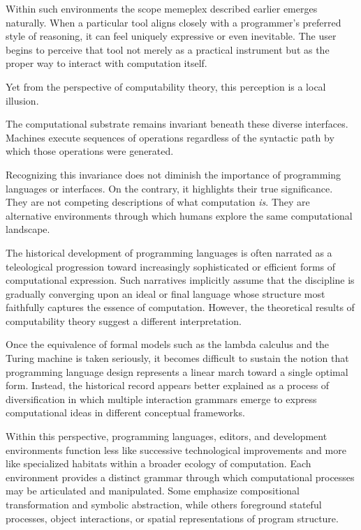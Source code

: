 \documentclass[11pt]{article}
\theoremstyle{definition}
\begin{document}
Within such environments the scope memeplex described earlier emerges
naturally. When a particular tool aligns closely with a programmer's
preferred style of reasoning, it can feel uniquely expressive or even
inevitable. The user begins to perceive that tool not merely as a
practical instrument but as the proper way to interact with
computation itself.

Yet from the perspective of computability theory, this perception is a
local illusion.

The computational substrate remains invariant beneath these diverse
interfaces. Machines execute sequences of operations regardless of the
syntactic path by which those operations were generated.

Recognizing this invariance does not diminish the importance of
programming languages or interfaces. On the contrary, it highlights
their true significance. They are not competing descriptions of what
computation \emph{is}. They are alternative environments through which
humans explore the same computational landscape.


The historical development of programming languages is often narrated as a teleological progression toward increasingly sophisticated or efficient forms of computational expression. Such narratives implicitly assume that the discipline is gradually converging upon an ideal or final language whose structure most faithfully captures the essence of computation. However, the theoretical results of computability theory suggest a different interpretation.

Once the equivalence of formal models such as the lambda calculus and the Turing machine is taken seriously, it becomes difficult to sustain the notion that programming language design represents a linear march toward a single optimal form. Instead, the historical record appears better explained as a process of diversification in which multiple interaction grammars emerge to express computational ideas in different conceptual frameworks.

Within this perspective, programming languages, editors, and development environments function less like successive technological improvements and more like specialized habitats within a broader ecology of computation. Each environment provides a distinct grammar through which computational processes may be articulated and manipulated. Some emphasize compositional transformation and symbolic abstraction, while others foreground stateful processes, object interactions, or spatial representations of program structure.
\end{document}
